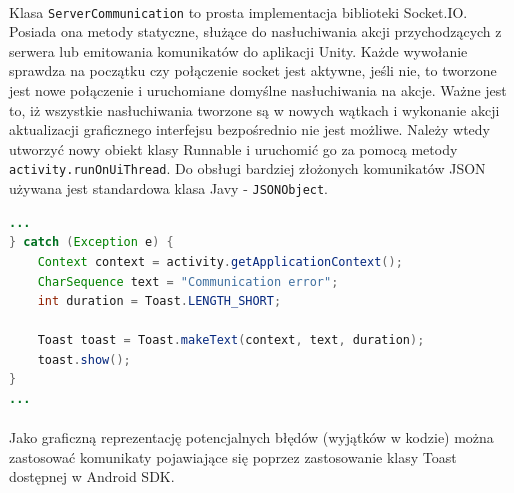 \paragraph{}
Klasa \texttt{ServerCommunication} to prosta implementacja biblioteki Socket.IO.  Posiada ona metody statyczne, służące do nasłuchiwania akcji przychodzących z serwera lub emitowania komunikatów do aplikacji Unity. Każde wywołanie sprawdza na początku czy połączenie socket jest aktywne, jeśli nie, to tworzone jest nowe połączenie i uruchomiane domyślne nasłuchiwania na akcje. 
Ważne jest to, iż wszystkie nasłuchiwania tworzone są w nowych wątkach i wykonanie akcji aktualizacji graficznego interfejsu bezpośrednio nie jest możliwe. Należy wtedy utworzyć nowy obiekt klasy Runnable i uruchomić go za pomocą metody \texttt{activity.runOnUiThread}. Do obsługi bardziej złożonych komunikatów JSON używana jest standardowa klasa Javy - \texttt{JSONObject}.
\begin{lstlisting}[language=Java]
...
} catch (Exception e) {
    Context context = activity.getApplicationContext();
    CharSequence text = "Communication error";
    int duration = Toast.LENGTH_SHORT;

    Toast toast = Toast.makeText(context, text, duration);
    toast.show();
}
...
\end{lstlisting}
\paragraph{}
Jako graficzną reprezentację potencjalnych błędów (wyjątków w kodzie) można zastosować komunikaty pojawiające się poprzez zastosowanie klasy Toast dostępnej w Android SDK.
